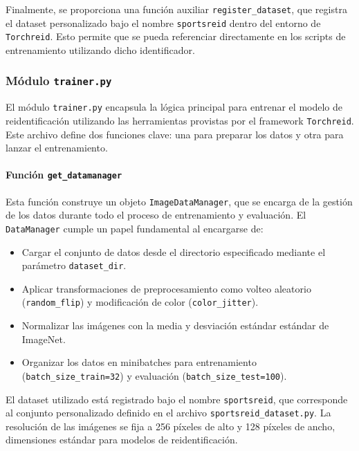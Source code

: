 \documentclass[12pt, a4paper, twoside]{article}
\begin{document}
	Finalmente, se proporciona una función auxiliar \texttt{register\_dataset}, que registra el dataset personalizado bajo el nombre \texttt{sportsreid} dentro del entorno de \texttt{Torchreid}. Esto permite que se pueda referenciar directamente en los scripts de entrenamiento utilizando dicho identificador.
	
	
	\subsubsection{Módulo \texttt{trainer.py}}
	
	El módulo \texttt{trainer.py} encapsula la lógica principal para entrenar el modelo de reidentificación utilizando las herramientas provistas por el framework \texttt{Torchreid}. Este archivo define dos funciones clave: una para preparar los datos y otra para lanzar el entrenamiento.
	
	\paragraph{Función \texttt{get\_datamanager}}
	
	Esta función construye un objeto \texttt{ImageDataManager}, que se encarga de la gestión de los datos durante todo el proceso de entrenamiento y evaluación. El \texttt{DataManager} cumple un papel fundamental al encargarse de:
	
	\begin{itemize}
		\item Cargar el conjunto de datos desde el directorio especificado mediante el parámetro \texttt{dataset\_dir}.
		\item Aplicar transformaciones de preprocesamiento como volteo aleatorio (\texttt{random\_flip}) y modificación de color (\texttt{color\_jitter}).
		\item Normalizar las imágenes con la media y desviación estándar estándar de ImageNet.
		\item Organizar los datos en minibatches para entrenamiento (\texttt{batch\_size\_train=32}) y evaluación (\texttt{batch\_size\_test=100}).
	\end{itemize}
	
	El dataset utilizado está registrado bajo el nombre \texttt{sportsreid}, que corresponde al conjunto personalizado definido en el archivo \texttt{sportsreid\_dataset.py}. La resolución de las imágenes se fija a 256 píxeles de alto y 128 píxeles de ancho, dimensiones estándar para modelos de reidentificación.
	
\end{document}
